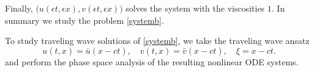 \documentclass{amsart}
\theoremstyle{definition}
\numberwithin{equation}{section}
\begin{document}
Finally, $\big(u(\epsilon t, \epsilon x), v(\epsilon t, \epsilon x)\big)$ solves the system with the viscosities $1$. In summary we study the problem \eqref{systemb}.





\bigskip

To study traveling wave solutions of \eqref{systemb}, we take the traveling wave ansatz
$$u(t,x) = \bar{u}(x-ct), \quad v(t,x) = \bar{v}(x-ct), \quad \xi = x-ct.$$
and perform the phase space analysis of the resulting nonlinear ODE systems. 
\end{document}
